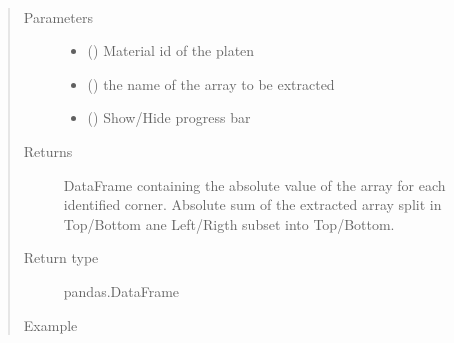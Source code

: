 \documentclass[letterpaper,10pt,english]{sphinxmanual}
\begin{document}
\begin{fulllineitems}

\begin{fulllineitems}
\label{\detokenize{openfdem:openfdem.openfdem.Model.direct_shear_calculation}}~\begin{quote}\begin{description}
\item[{Parameters}] \leavevmode\begin{itemize}
\item {} 
 () \textendash{} Material id of the platen

\item {} 
 () \textendash{} the name of the array to be extracted

\item {} 
 () \textendash{} Show/Hide progress bar

\end{itemize}

\item[{Returns}] \leavevmode
DataFrame containing the absolute value of the array for each identified corner. Absolute sum of the extracted array split in Top/Bottom ane Left/Rigth sub\sphinxhyphen{}set into Top/Bottom.

\item[{Return type}] \leavevmode
pandas.DataFrame

\item[{Example}] \leavevmode
\end{description}\end{quote}


\end{fulllineitems}
\end{fulllineitems}
\end{document}
